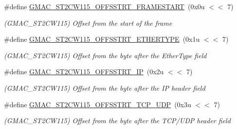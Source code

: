 \begin{DoxyCompactItemize}
\item 
\mbox{\label{group__SAME70__GMAC_ga690f96f9f9c3c3062550efbbb00be577}} 
\#define \mbox{\hyperlink{group__SAME70__GMAC_ga690f96f9f9c3c3062550efbbb00be577}{G\+M\+A\+C\+\_\+\+S\+T2\+C\+W115\+\_\+\+O\+F\+F\+S\+S\+T\+R\+T\+\_\+\+F\+R\+A\+M\+E\+S\+T\+A\+RT}}~(0x0u $<$$<$ 7)
\begin{DoxyCompactList}\small\item\em (G\+M\+A\+C\+\_\+\+S\+T2\+C\+W115) Offset from the start of the frame \end{DoxyCompactList}\item 
\mbox{\label{group__SAME70__GMAC_gaae9c00137903a38206221d9a99873fc2}} 
\#define \mbox{\hyperlink{group__SAME70__GMAC_gaae9c00137903a38206221d9a99873fc2}{G\+M\+A\+C\+\_\+\+S\+T2\+C\+W115\+\_\+\+O\+F\+F\+S\+S\+T\+R\+T\+\_\+\+E\+T\+H\+E\+R\+T\+Y\+PE}}~(0x1u $<$$<$ 7)
\begin{DoxyCompactList}\small\item\em (G\+M\+A\+C\+\_\+\+S\+T2\+C\+W115) Offset from the byte after the Ether\+Type field \end{DoxyCompactList}\item 
\mbox{\label{group__SAME70__GMAC_ga4056425384cabb83d02dd4669abe3f1b}} 
\#define \mbox{\hyperlink{group__SAME70__GMAC_ga4056425384cabb83d02dd4669abe3f1b}{G\+M\+A\+C\+\_\+\+S\+T2\+C\+W115\+\_\+\+O\+F\+F\+S\+S\+T\+R\+T\+\_\+\+IP}}~(0x2u $<$$<$ 7)
\begin{DoxyCompactList}\small\item\em (G\+M\+A\+C\+\_\+\+S\+T2\+C\+W115) Offset from the byte after the IP header field \end{DoxyCompactList}\item 
\mbox{\label{group__SAME70__GMAC_ga1d08bb4fd7578ca3b5b3eaa8091b956b}} 
\#define \mbox{\hyperlink{group__SAME70__GMAC_ga1d08bb4fd7578ca3b5b3eaa8091b956b}{G\+M\+A\+C\+\_\+\+S\+T2\+C\+W115\+\_\+\+O\+F\+F\+S\+S\+T\+R\+T\+\_\+\+T\+C\+P\+\_\+\+U\+DP}}~(0x3u $<$$<$ 7)
\begin{DoxyCompactList}\small\item\em (G\+M\+A\+C\+\_\+\+S\+T2\+C\+W115) Offset from the byte after the T\+C\+P/\+U\+DP header field \end{DoxyCompactList}\item 
\mbox{\label{group__SAME70__GMAC_ga2e0b01f05028b92586613053d3e8003e}} 

\end{DoxyCompactItemize}
